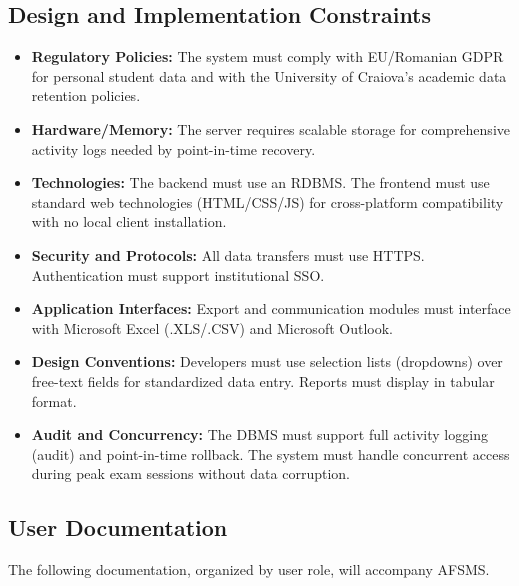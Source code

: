 \documentclass[11pt, a4paper]{article}
\begin{document}
\subsection{Design and Implementation Constraints}
\begin{itemize}
    \item \textbf{Regulatory Policies:} The system must comply with EU/Romanian GDPR for personal student data and with the University of Craiova's academic data retention policies.
    \item \textbf{Hardware/Memory:} The server requires scalable storage for comprehensive activity logs needed by point-in-time recovery.
    \item \textbf{Technologies:} The backend must use an RDBMS. The frontend must use standard web technologies (HTML/CSS/JS) for cross-platform compatibility with no local client installation.
    \item \textbf{Security and Protocols:} All data transfers must use HTTPS. Authentication must support institutional SSO.
    \item \textbf{Application Interfaces:} Export and communication modules must interface with Microsoft Excel (.XLS/.CSV) and Microsoft Outlook.
    \item \textbf{Design Conventions:} Developers must use selection lists (dropdowns) over free-text fields for standardized data entry. Reports must display in tabular format.
    \item \textbf{Audit and Concurrency:} The DBMS must support full activity logging (audit) and point-in-time rollback. The system must handle concurrent access during peak exam sessions without data corruption.
\end{itemize}

\subsection{User Documentation}
The following documentation, organized by user role, will accompany AFSMS.
\end{document}
